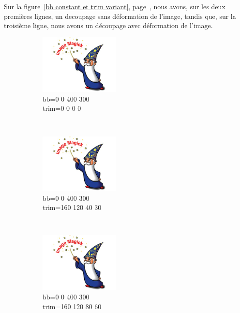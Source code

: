 Sur la figure~\ref{bb constant et trim variant}, page~\pageref{bb constant et trim variant},
nous avons, sur les deux premières lignes, un decoupage sans déformation de l'image, 
tandis que, sur la troisième ligne, nous avons un découpage avec déformation de l'image.

\begin{figure}[h]
    \centering
    \begin{subfigure}[b]{0.3\textwidth}
        \includegraphics[bb=0 0 400 300,trim=0 0 0 0,width=4cm,height=3cm,clip=true]{test.jpg}
        \caption{bb=0 0 400 300\\trim=0 0 0 0}
        \label{essai_4}
    \end{subfigure}
    ~
    \begin{subfigure}[b]{0.3\textwidth}
        \includegraphics[bb=0 0 400 300,trim=160 120 40 30,width=4cm,height=3cm,clip=true]{test.jpg}
        \caption{bb=0 0 400 300\\trim=160 120 40 30}%
        \label{essai_5}
    \end{subfigure}
    ~
    \begin{subfigure}[b]{0.3\textwidth}
        \includegraphics[bb=0 0 400 300,trim=160 120 80 60,width=4cm,height=3cm,clip=true]{test.jpg}
        \caption{bb=0 0 400 300\\trim=160 120 80 60}%
        \label{essai_6}
    \end{subfigure}
    \\
    \begin{subfigure}[b]{0.3\textwidth}

\end{subfigure}
\end{figure}
